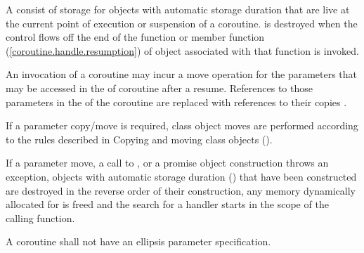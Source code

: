 \pnum
A  consist of 
storage for objects with automatic storage duration
that are live at the current point of execution or suspension of 
a coroutine.
 is destroyed when
the control flows off the end of the function or
 member function (\ref{coroutine.handle.resumption}) of  object associated with that function is invoked.

\pnum
An invocation of a coroutine may incur a move operation for the parameters that may be accessed in the 
of coroutine after a resume. 
References to those parameters in the 
of the coroutine are replaced with 
references to their copies .

\pnum
If a parameter copy/move is required, class object moves are performed according to the rules described in Copying and moving class objects ().

\pnum
If a parameter move, a call to , or a promise object construction throws
an exception, objects with automatic storage duration () that have been
constructed are destroyed in the reverse order of their construction, any memory dynamically allocated 
for  is freed
and the search for a handler starts in the scope of the calling function. 

\pnum
A coroutine shall not have an ellipsis parameter specification. 


%
